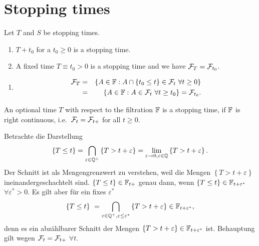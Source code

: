 \section{Stopping times}

 Let $T$ and $S$ be stopping times. 
\begin{enumerate}
    \item $T + t_0$ for a $t_0\geq 0$ is a stopping time.
    \item A fixed time $T \equiv t_0>0$ is a stopping time and we have $\mathcal F_T = \mathcal F_{t_0}$.
\end{enumerate}

\solution
\begin{enumerate}
    \item \begin{align*}
            \mathcal F_T &=& 
            \left\{ A\in\mathbb F : A \cap \left\{ t_0 \leq t \right\}\in\mathcal F_t \ \forall t\geq 0 \right\} \\
            &=& \left\{ A\in\mathbb F : A\in\mathcal F_t \ \forall t\geq t_0 \right\} = \mathcal F_{t_0}.
        \end{align*}
\end{enumerate}

 An optional time $T$ with respect
to the filtration $\mathbb F$ is a stopping time, if $\mathbb F$ is right continuous, i.e.\
$\mathcal F_t=\mathcal F_{t+}$ for all $t\geq 0$.

\solution  Betrachte die Darstellung
\begin{eqnarray}
    \left\{ T \leq t \right\} = \bigcap_{\varepsilon\in\mathbb Q^{+}} \left\{ T > t+\varepsilon \right\}
    = \lim_{\varepsilon\to 0, \varepsilon\in\mathbb Q} \left\{ T > t+\varepsilon \right\}.
\end{eqnarray}
Der Schnitt ist als Mengengrenzwert zu verstehen, weil die Mengen $\left\{ T >
t+\varepsilon \right\}$ ineinandergeschachtelt sind. $\left\{ T \leq t \right\}\in \mathbb F_{t+}$
genau dann, wenn $\left\{ T \leq t \right\}\in \mathbb F_{t+\varepsilon^{*}}$ $\forall \varepsilon^{*}>0$.
Es gilt aber für ein fixes $\varepsilon^{*}$
\begin{equation}
    \left\{ T \leq t \right\}\ = 
    \bigcap_{\varepsilon\in\mathbb Q^{+}, \varepsilon\leq \varepsilon^{*}} \left\{ T > t+\varepsilon \right\} 
    \in\mathbb F_{t+\varepsilon^{*}},
\end{equation}
denn es ein abzählbarer Schnitt der Mengen $\left\{ T> t+\varepsilon
\right\}\in\mathbb F_{t+\varepsilon^{*}}$ ist. Behauptung gilt wegen $\mathcal F_t=\mathcal F_{t+}$ $\forall t$.


